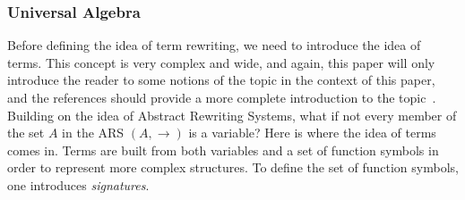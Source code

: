 \documentclass[12pt]{article}
\begin{document}
\subsubsection{Universal Algebra}
Before defining the idea of term rewriting, we need to introduce the idea of terms. This concept is very complex and wide, and again, this paper will only introduce the reader to some notions of the topic in the context of this paper, and the references should provide a more complete introduction to the topic~\cite{term-rewriting-and-all-that}.
Building on the idea of Abstract Rewriting Systems, what if not every member of the set $A$ in the ARS $(A, \rightarrow )$ is a variable? Here is where the idea of terms comes in. Terms are built from both variables and a set of function symbols in order to represent more complex structures. To define the set of function symbols, one introduces \textit{signatures}.
\end{document}
